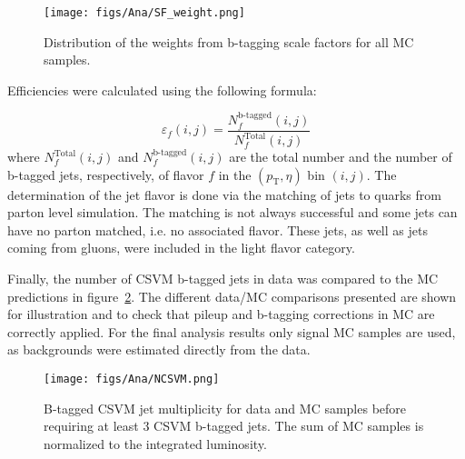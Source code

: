 
\begin{figure}[!Hhtbp]
  \begin{center}
    \texttt{[image: figs/Ana/SF\_weight.png]}
    \caption{Distribution of the weights from b-tagging scale factors for all MC samples.}
    \label{fig:SFweight}
  \end{center}
\end{figure}

Efficiencies were calculated using the following formula:

\begin{equation}
  \label{eq:btaggingeff}
  \varepsilon_f(i,j) = \frac{N_f^\text{b-tagged}(i,j)}{N_f^\text{Total}(i,j)}
\end{equation} where $ N_f^\text{Total}(i,j) $ and $ N_f^\text{b-tagged}(i,j) $ are the total number and the number of b-tagged jets, respectively, of flavor $ f $ in the $ (p_\text{T},\eta) $ bin $ (i,j) $. The determination of the jet flavor is done via the matching of jets to quarks from parton level simulation. The matching is not always successful and some jets can have no parton matched, i.e. no associated flavor. These jets, as well as jets coming from gluons, were included in the light flavor category.

Finally, the number of CSVM b-tagged jets in data was compared to the MC predictions in figure~\ref{fig:Nb}. The different data/MC comparisons presented are shown for illustration and to check that pileup and b-tagging corrections in MC are correctly applied. For the final analysis results only signal MC samples are used, as backgrounds were estimated directly from the data.

\begin{figure}[!Hhtbp]
  \begin{center}
    \texttt{[image: figs/Ana/NCSVM.png]}
    \caption{B-tagged CSVM jet multiplicity for data and MC samples before requiring at least 3 CSVM b-tagged jets. The sum of MC samples is normalized to the integrated luminosity.}
    \label{fig:Nb}
  \end{center}
\end{figure}

